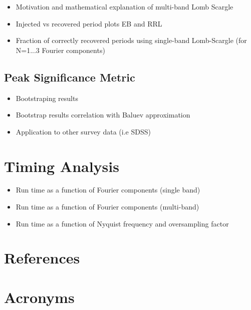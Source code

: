 \documentclass[DM,authoryear,toc]{lsstdoc}
\begin{document}
\begin{itemize}
\item Motivation and mathematical explanation of multi-band Lomb Scargle 
\item Injected vs recovered period plots EB and RRL
\item Fraction of correctly recovered periods using single-band Lomb-Scargle (for N=1...3 Fourier components)  
\end{itemize}


\subsection{Peak Significance Metric}

\begin{itemize}
\item Bootstraping results 
\item Bootstrap results correlation with Baluev approximation
\item Application to other survey data (i.e SDSS)
\end{itemize}


\section{Timing Analysis}

\begin{itemize}
\item Run time as a function of Fourier components (single band)
\item Run time as a function of Fourier components (multi-band)
\item Run time as a function of Nyquist frequency and oversampling factor
\end{itemize}





\appendix
\section{References} \label{sec:bib}
\renewcommand{\refname}{} %


\section{Acronyms} \label{sec:acronyms}

\end{document}

